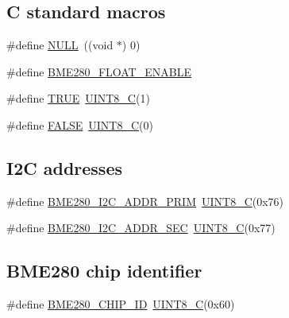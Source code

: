 \subsection*{C standard macros}
\begin{DoxyCompactItemize}
\item 
\#define \hyperlink{group___b_m_e280_ga070d2ce7b6bb7e5c05602aa8c308d0c4}{N\+U\+LL}~((void $\ast$) 0)
\item 
\#define \hyperlink{group___b_m_e280_ga1f8aefa20d6054afa77893ea854d9159}{B\+M\+E280\+\_\+\+F\+L\+O\+A\+T\+\_\+\+E\+N\+A\+B\+LE}
\item 
\#define \hyperlink{group___b_m_e280_gaa8cecfc5c5c054d2875c03e77b7be15d}{T\+R\+UE}~\hyperlink{group___b_m_e280_gacd2aa09844a8a245cf7fdbb808e215e5}{U\+I\+N\+T8\+\_\+C}(1)
\item 
\#define \hyperlink{group___b_m_e280_gaa93f0eb578d23995850d61f7d61c55c1}{F\+A\+L\+SE}~\hyperlink{group___b_m_e280_gacd2aa09844a8a245cf7fdbb808e215e5}{U\+I\+N\+T8\+\_\+C}(0)
\end{DoxyCompactItemize}
\subsection*{I2C addresses}
\begin{DoxyCompactItemize}
\item 
\#define \hyperlink{group___b_m_e280_ga34f07b8a4a9b1f48641b131f3dff720c}{B\+M\+E280\+\_\+\+I2\+C\+\_\+\+A\+D\+D\+R\+\_\+\+P\+R\+IM}~\hyperlink{group___b_m_e280_gacd2aa09844a8a245cf7fdbb808e215e5}{U\+I\+N\+T8\+\_\+C}(0x76)
\item 
\#define \hyperlink{group___b_m_e280_gad8bc0d50730a48164ee3a882139e9959}{B\+M\+E280\+\_\+\+I2\+C\+\_\+\+A\+D\+D\+R\+\_\+\+S\+EC}~\hyperlink{group___b_m_e280_gacd2aa09844a8a245cf7fdbb808e215e5}{U\+I\+N\+T8\+\_\+C}(0x77)
\end{DoxyCompactItemize}
\subsection*{B\+M\+E280 chip identifier}
\begin{DoxyCompactItemize}
\item 
\#define \hyperlink{group___b_m_e280_gaa9471d8f9c99880c3b85360017908e6b}{B\+M\+E280\+\_\+\+C\+H\+I\+P\+\_\+\+ID}~\hyperlink{group___b_m_e280_gacd2aa09844a8a245cf7fdbb808e215e5}{U\+I\+N\+T8\+\_\+C}(0x60)
\end{DoxyCompactItemize}
